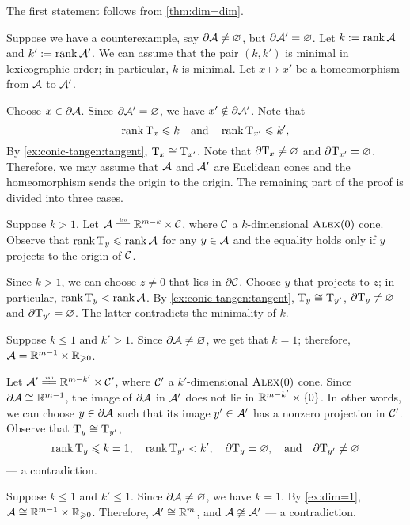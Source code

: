 The first statement follows from \ref{thm:dim=dim}.

Suppose we have a counterexample, say $\partial \mathcal{A}\ne \varnothing$, but $\partial \mathcal{A}'=\varnothing$.
Let $k\mathrel{:=}\operatorname{\rm rank}\nolimits \mathcal{A}$ and $k'\mathrel{:=}\operatorname{\rm rank}\nolimits \mathcal{A}'$.
We can assume that the pair $(k,k')$ is minimal in lexicographic order;
in particular, $k$ is minimal.
Let $x\mapsto x'$ be a homeomorphism from $\mathcal{A}$ to $\mathcal{A}'$.

Choose $x\in \partial \mathcal{A}$.
Since $\partial \mathcal{A}'=\varnothing$, we have $x'\notin \partial \mathcal{A}'$.
Note that 
\[\operatorname{\rm rank}\nolimits \mathrm{T}_x\leqslant k
\quad\text{and}\quad
\operatorname{\rm rank}\nolimits \mathrm{T}_{x'}\leqslant k',
\]
By \ref{ex:conic-tangen:tangent}, $\mathrm{T}_x\cong\mathrm{T}_{x'}$.
Note that $\partial \mathrm{T}_x\ne\varnothing$ and $\partial \mathrm{T}_{x'}=\varnothing$.
Therefore, we may assume that $\mathcal{A}$ and $\mathcal{A}'$ are Euclidean cones
and the homeomorphism sends the origin to the origin.
The remaining part of the proof is divided into three cases.

Suppose $k>1$.
Let $\spc{A}\iso \RR^{m-k}\times \spc{C}$, where $\mathcal{C}$ a $k$-dimensional $\textsc{Alex}(0)$ cone.
Observe that $\operatorname{\rm rank}\nolimits\mathrm{T}_y\leqslant\operatorname{\rm rank}\nolimits\mathcal{A}$ for any $y\in\mathcal{A}$ and the equality holds only if $y$ projects to the origin of $\mathcal{C}$.

Since $k>1$, we can choose $z\ne 0$ that lies in $\partial\mathcal{C}$.
Choose $y$ that projects to $z$;
in particular, $\operatorname{\rm rank}\nolimits\mathrm{T}_y<\operatorname{\rm rank}\nolimits\mathcal{A}$.
By \ref{ex:conic-tangen:tangent}, $\mathrm{T}_y\cong\mathrm{T}_{y'}$,
$\partial  \mathrm{T}_y\ne\varnothing$ and $\partial \mathrm{T}_{y'}=\varnothing$.
The latter contradicts the minimality of $k$.

 Suppose $k\le1$ and $k'>1$.
Since $\partial \mathcal{A}\ne \varnothing$, we get that $k=1$;
therefore, $\mathcal{A}=\mathbb{R}^{m-1}\times\mathbb{R}_{\geqslant0}$.

Let $\spc{A}'\iso \RR^{m-k'}\times \spc{C}'$, where $\mathcal{C}'$ a $k'$-dimensional $\textsc{Alex}(0)$ cone.
Since $\partial\mathcal{A}\cong\mathbb{R}^{m-1}$,
the image of $\partial\mathcal{A}$ in $\mathcal{A}'$ does not lie in $\mathbb{R}^{m-k'}\times\{0\}$.
In other words, we can choose $y\in \partial \mathcal{A}$ such that its image $y'\in \mathcal{A}'$ has a nonzero projection in $\mathcal{C}'$.
Observe that $\mathrm{T}_y\cong\mathrm{T}_{y'}$,
\[
\operatorname{\rm rank}\nolimits\mathrm{T}_y\leqslant k=1,
\quad
\operatorname{\rm rank}\nolimits\mathrm{T}_{y'}< k',
\quad
\partial \mathrm{T}_y=\varnothing,
\quad\text{and}\quad
\partial \mathrm{T}_{y'}\ne \varnothing\]
--- a contradiction.

Suppose $k\le 1$ and $k'\le 1$.
Since $\partial \mathcal{A}\ne \varnothing$, we have $k=1$.
By \ref{ex:dim=1}, $\mathcal{A}\cong \mathbb{R}^{m-1}\times\mathbb{R}_{\geqslant0}$.
Therefore, $\mathcal{A}'\cong\mathbb{R}^m$, and $\mathcal{A}\ncong\mathcal{A}'$ --- a contradiction.
\qeds

